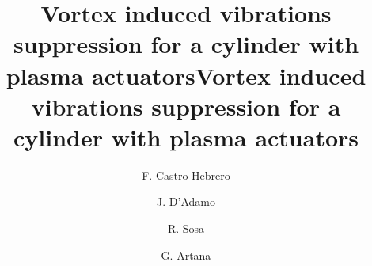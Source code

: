 \documentclass[review]{elsarticle}
\title{Vortex induced vibrations suppression for a cylinder with plasma actuators}
\begin{document}
\begin{frontmatter}

\title{Vortex induced vibrations suppression for a cylinder with plasma actuators
}


\author[FIUBA]{F. Castro Hebrero }

\author[FIUBA,CONICET]{J. D'Adamo}
\author[FIUBA,CONICET]{R. Sosa}
\author[FIUBA,CONICET]{G. Artana}

\address[FIUBA]{Fluid Dynamics Laboratory, Buenos Aires University, Argentina.}
\address[CONICET]{National Research Scientific and Technical Council, Argentina.}







\end{frontmatter}
\end{document}
